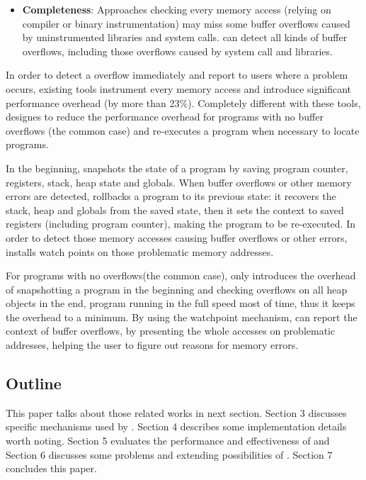 \begin{itemize}
\item \textbf{Completeness}:
Approaches checking every memory access (relying on compiler or binary instrumentation)
may miss some buffer overflows caused by uninstrumented libraries and system calls. 
\doubletake{} can detect all kinds of buffer overflows, including those overflows caused by
system call and libraries.
  
\end{itemize} 


In order to detect a overflow immediately and report to users where a problem occurs,
existing tools instrument every memory access and introduce significant 
performance overhead (by more than 23\%). 
Completely different with these tools, \doubletake{} designes to reduce the performance overhead for 
programs with no buffer overflows (the common case) and re-executes a program when necessary to locate 
programs. 

In the beginning, \doubletake{} snapshots the state of a program by saving program counter,
registers, stack, heap state and globals. 
When buffer overflows or other memory errors are detected, \doubletake{} rollbacks a program
to its previous state: it recovers the stack, heap and globals from the saved state,
then it sets the context to saved registers (including program counter),
 making the program to be re-executed.
In order to detect those memory accesses causing buffer overflows or other errors, 
\doubletake{} installs watch points on those problematic memory addresses. 
  
For programs with no overflows(the common case), \doubletake{} only introduces the overhead 
of snapshotting a program in the beginning and checking overflows on all heap objects 
in the end, program running in the full speed most of time,  
thus it keeps the overhead to a minimum.
By using the watchpoint mechanism, \doubletake{} can report the context of buffer overflows, by presenting the whole accesses on problematic addresses, helping the user to figure out reasons for memory errors.

\subsection{Outline}
This paper talks about those related works in next section. Section 3 discusses specific mechanisms 
used by \doubletake{}. Section 4 describes some implementation details worth noting. 
Section 5 evaluates the performance and effectiveness of \doubletake{} and Section 6
discusses some problems and extending possibilities of \doubletake{}.
Section 7 concludes this paper.

